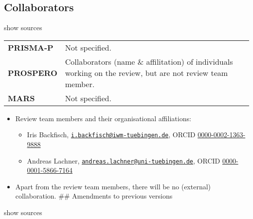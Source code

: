 \documentclass[
]{article}
\providecommand{\tightlist}{%
  \setlength{\itemsep}{0pt}\setlength{\parskip}{0pt}}
\begin{document}
\hypertarget{collaborators}{%
\subsection{Collaborators}\label{collaborators}}

show sources

\hypertarget{colla}{}
\begin{collapse}

\begin{table}[H]
\centering
\begin{tabular}{>{}l|l}
\hline
\cellcolor[HTML]{ececec}{source} & \cellcolor[HTML]{ececec}{description}\\
\hline
\textbf{PRISMA-P} & Not specified.\\
\hline
\textbf{PROSPERO} & Collaborators (name \& affilitation) of individuals working on the review, but are not review team member.\\
\hline
\textbf{MARS} & Not specified.\\
\hline
\end{tabular}
\end{table}

\end{collapse}

\begin{itemize}
\tightlist
\item
  Review team members and their organisational affiliations:

  \begin{itemize}
  \tightlist
  \item
    Iris Backfisch,
    \href{mailto:i.backfisch@iwm-tuebingen.de}{\nolinkurl{i.backfisch@iwm-tuebingen.de}},
    ORCID
    \href{https://orcid.org/0000-0002-1363-9888}{0000-0002-1363-9888}
  \item
    Andreas Lachner,
    \href{mailto:andreas.lachner@uni-tuebingen.de}{\nolinkurl{andreas.lachner@uni-tuebingen.de}},
    ORCID
    \href{https://orcid.org/0000-0001-5866-7164}{0000-0001-5866-7164}
  \end{itemize}
\item
  Apart from the review team members, there will be no (external)
  collaboration. \#\# Amendments to previous versions
\end{itemize}

show sources
\end{document}
